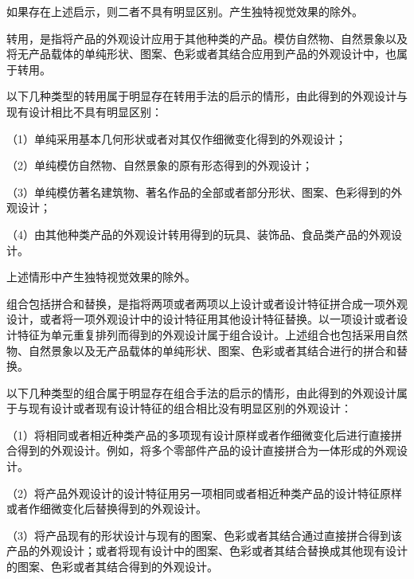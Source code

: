 如果存在上述启示，则二者不具有明显区别。产生独特视觉效果的除外。

转用，是指将产品的外观设计应用于其他种类的产品。模仿自然物、自然景象以及将无产品载体的单纯形状、图案、色彩或者其结合应用到产品的外观设计中，也属于转用。

以下几种类型的转用属于明显存在转用手法的启示的情形，由此得到的外观设计与现有设计相比不具有明显区别：

{\setlength{\parindent}{17.1bp}（1）单纯采用基本几何形状或者对其仅作细微变化得到的外观设计；\par}

{\setlength{\parindent}{17.1bp}（2）单纯模仿自然物、自然景象的原有形态得到的外观设计；\par}

{\setlength{\parindent}{17.1bp}（3）单纯模仿著名建筑物、著名作品的全部或者部分形状、图案、色彩得到的外观设计；\par}

{\setlength{\parindent}{17.1bp}（4）由其他种类产品的外观设计转用得到的玩具、装饰品、食品类产品的外观设计。\par}

上述情形中产生独特视觉效果的除外。

组合包括拼合和替换，是指将两项或者两项以上设计或者设计特征拼合成一项外观设计，或者将一项外观设计中的设计特征用其他设计特征替换。以一项设计或者设计特征为单元重复排列而得到的外观设计属于组合设计。上述组合也包括采用自然物、自然景象以及无产品载体的单纯形状、图案、色彩或者其结合进行的拼合和替换。

以下几种类型的组合属于明显存在组合手法的启示的情形，由此得到的外观设计属于与现有设计或者现有设计特征的组合相比没有明显区别的外观设计：

{\setlength{\parindent}{17.1bp}（1）将相同或者相近种类产品的多项现有设计原样或者作细微变化后进行直接拼合得到的外观设计。例如，将多个零部件产品的设计直接拼合为一体形成的外观设计。\par}

{\setlength{\parindent}{17.1bp}（2）将产品外观设计的设计特征用另一项相同或者相近种类产品的设计特征原样或者作细微变化后替换得到的外观设计。\par}

{\setlength{\parindent}{17.1bp}（3）将产品现有的形状设计与现有的图案、色彩或者其结合通过直接拼合得到该产品的外观设计；或者将现有设计中的图案、色彩或者其结合替换成其他现有设计的图案、色彩或者其结合得到的外观设计。\par}

